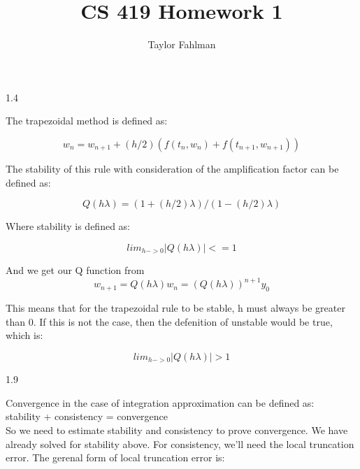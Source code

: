 \documentclass{article}
\begin{document}
\title{CS 419 Homework 1}
\author{Taylor Fahlman}
\maketitle
\begin{flushleft}
1.4\\
\end{flushleft}
The trapezoidal method is defined as:


\begin{equation}
    w_n = w_{n+1} + (h/2)(f(t_n, w_n) + f(t_{n+1}, w_{n+1}))
\end{equation}


The stability of this rule with consideration of the amplification factor can be defined as:

\begin{equation}
    Q(h\lambda) = (1+(h/2)\lambda)/(1-(h/2)\lambda)
\end{equation}

Where stability is defined as:

\begin{equation}
    lim_{h->0}|Q(h\lambda)|< = 1
\end{equation}

And we get our Q function from
\begin{equation}
    w_{n+1} = Q(h\lambda)w_n = (Q(h\lambda))^{n+1}y_0
\end{equation}

This means that for the trapezoidal rule to be stable, h must always be greater than 0. If this is not the case,
then the defenition of unstable would be true, which is:

\begin{equation}
    lim_{h->0}|Q(h\lambda)|> 1
\end{equation}

\begin{flushleft}
1.9
\end{flushleft}

Convergence in the case of integration approximation can be defined as: \\

stability + consistency = convergence\\

So we need to estimate stability and consistency to prove convergence. We have
already solved for stability above. For consistency, we'll need the local truncation error.
The gerenal form of local truncation error is:
\end{document}
